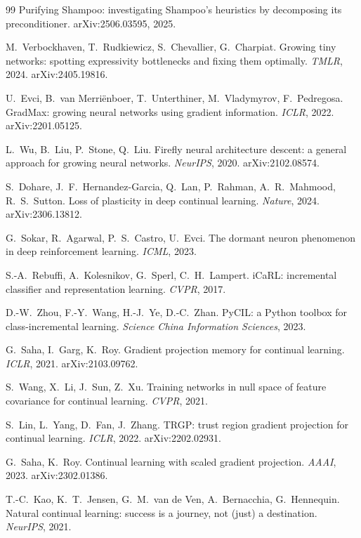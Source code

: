 \begin{thebibliography}{99}
 Purifying Shampoo: investigating Shampoo's heuristics by decomposing its preconditioner. arXiv:2506.03595, 2025.

 M.~Verbockhaven, T.~Rudkiewicz, S.~Chevallier, G.~Charpiat. Growing tiny networks: spotting expressivity bottlenecks and fixing them optimally. \emph{TMLR}, 2024. arXiv:2405.19816.

 U.~Evci, B.~van Merriënboer, T.~Unterthiner, M.~Vladymyrov, F.~Pedregosa. GradMax: growing neural networks using gradient information. \emph{ICLR}, 2022. arXiv:2201.05125.

 L.~Wu, B.~Liu, P.~Stone, Q.~Liu. Firefly neural architecture descent: a general approach for growing neural networks. \emph{NeurIPS}, 2020. arXiv:2102.08574.

 S.~Dohare, J.~F.~Hernandez-Garcia, Q.~Lan, P.~Rahman, A.~R.~Mahmood, R.~S.~Sutton. Loss of plasticity in deep continual learning. \emph{Nature}, 2024. arXiv:2306.13812.

 G.~Sokar, R.~Agarwal, P.~S.~Castro, U.~Evci. The dormant neuron phenomenon in deep reinforcement learning. \emph{ICML}, 2023.

 S.-A.~Rebuffi, A.~Kolesnikov, G.~Sperl, C.~H.~Lampert. iCaRL: incremental classifier and representation learning. \emph{CVPR}, 2017.\unv

 D.-W.~Zhou, F.-Y.~Wang, H.-J.~Ye, D.-C.~Zhan. PyCIL: a Python toolbox for class-incremental learning. \emph{Science China Information Sciences}, 2023.\unv

 G.~Saha, I.~Garg, K.~Roy. Gradient projection memory for continual learning. \emph{ICLR}, 2021. arXiv:2103.09762.

 S.~Wang, X.~Li, J.~Sun, Z.~Xu. Training networks in null space of feature covariance for continual learning. \emph{CVPR}, 2021.

 S.~Lin, L.~Yang, D.~Fan, J.~Zhang. TRGP: trust region gradient projection for continual learning. \emph{ICLR}, 2022. arXiv:2202.02931.

 G.~Saha, K.~Roy. Continual learning with scaled gradient projection. \emph{AAAI}, 2023. arXiv:2302.01386.

 T.-C.~Kao, K.~T.~Jensen, G.~M.~van de Ven, A.~Bernacchia, G.~Hennequin. Natural continual learning: success is a journey, not (just) a destination. \emph{NeurIPS}, 2021.


\end{thebibliography}

